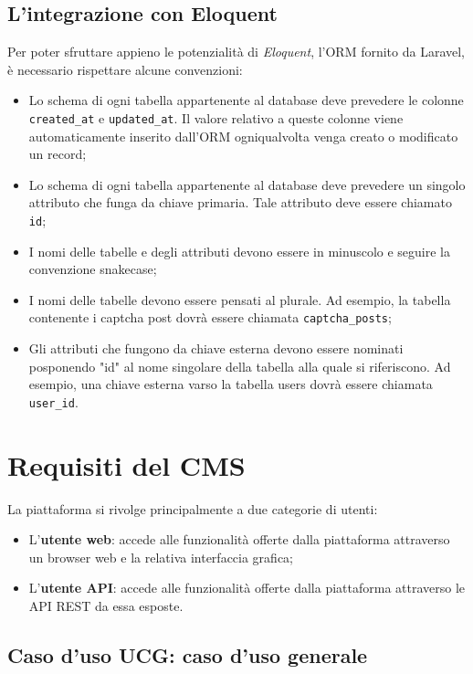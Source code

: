 \subsection{L'integrazione con Eloquent}
Per poter sfruttare appieno le potenzialità di \textit{Eloquent}, l'ORM fornito da Laravel, è necessario rispettare alcune convenzioni:
\begin{itemize}
	\item Lo schema di ogni tabella appartenente al database deve prevedere le colonne \verb!created_at! e \verb!updated_at!. Il valore relativo a queste colonne viene automaticamente inserito dall'ORM ogniqualvolta venga creato o modificato un record;
	\item Lo schema di ogni tabella appartenente al database deve prevedere un singolo attributo che funga da chiave primaria. Tale attributo deve essere chiamato \verb!id!;
	\item I nomi delle tabelle e degli attributi devono essere in minuscolo e seguire la convenzione \gls{snakecase}\glsfirstoccur{};
	\item I nomi delle tabelle devono essere pensati al plurale. Ad esempio, la tabella contenente i captcha post dovrà essere chiamata \verb!captcha_posts!;
		\item Gli attributi che fungono da chiave esterna devono essere nominati posponendo "id" al nome singolare della tabella alla quale si riferiscono. Ad esempio, una chiave esterna varso la tabella users dovrà essere chiamata \verb!user_id!.
\end{itemize}

\section{Requisiti del CMS}
La piattaforma si rivolge principalmente a due categorie di utenti:
\begin{itemize}
	\item L'\textbf{utente web}: accede alle funzionalità offerte dalla piattaforma attraverso un browser web e la relativa interfaccia grafica;
	\item L'\textbf{utente API}: accede alle funzionalità offerte dalla piattaforma attraverso le API REST da essa esposte. 
\end{itemize}

\hypertarget{UCG}{}
\subsection{Caso d'uso UCG: caso d'uso generale}

